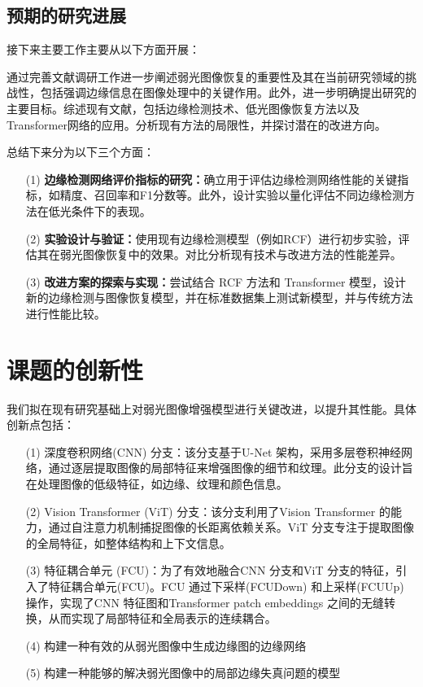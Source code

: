 \documentclass[a4paper]{ctexart}
\begin{document}
	\subsection{预期的研究进展}
	
	接下来主要工作主要从以下方面开展：
	
	通过完善文献调研工作进一步阐述弱光图像恢复的重要性及其在当前研究领域的挑战性，包括强调边缘信息在图像处理中的关键作用。此外，进一步明确提出研究的主要目标。综述现有文献，包括边缘检测技术、低光图像恢复方法以及Transformer网络的应用。分析现有方法的局限性，并探讨潜在的改进方向。
	
	总结下来分为以下三个方面：
	\begin{itemize}
		\item[(1)] \textbf{边缘检测网络评价指标的研究：}确立用于评估边缘检测网络性能的关键指标，如精度、召回率和F1分数等。此外，设计实验以量化评估不同边缘检测方法在低光条件下的表现。
		
		\item[(2)] \textbf{实验设计与验证：}使用现有边缘检测模型（例如RCF）进行初步实验，评估其在弱光图像恢复中的效果。对比分析现有技术与改进方法的性能差异。
		
		\item[(3)] \textbf{改进方案的探索与实现：}尝试结合 RCF 方法和 Transformer 模型，设计新的边缘检测与图像恢复模型，并在标准数据集上测试新模型，并与传统方法进行性能比较。
	\end{itemize}
	
	\section{课题的创新性}
	
	我们拟在现有研究基础上对弱光图像增强模型进行关键改进，以提升其性能。具体创新点包括：
	
	\begin{itemize}
		\item [(1)] 深度卷积网络(CNN) 分支：该分支基于U-Net 架构，采用多层卷积神经网络，通过逐层提取图像的局部特征来增强图像的细节和纹理。此分支的设计旨在处理图像的低级特征，如边缘、纹理和颜色信息。
		
		\item [(2)] Vision Transformer (ViT) 分支：该分支利用了Vision Transformer 的能力，通过自注意力机制捕捉图像的长距离依赖关系。ViT 分支专注于提取图像的全局特征，如整体结构和上下文信息。
		
		\item [(3)] 特征耦合单元 (FCU)：为了有效地融合CNN 分支和ViT 分支的特征，引入了特征耦合单元(FCU)。FCU 通过下采样(FCUDown) 和上采样(FCUUp) 操作，实现了CNN 特征图和Transformer patch embeddings 之间的无缝转换，从而实现了局部特征和全局表示的连续耦合。
		
		\item [(4)] 构建一种有效的从弱光图像中生成边缘图的边缘网络
		
		\item [(5)] 构建一种能够的解决弱光图像中的局部边缘失真问题的模型
	\end{itemize}
	
\end{document}
